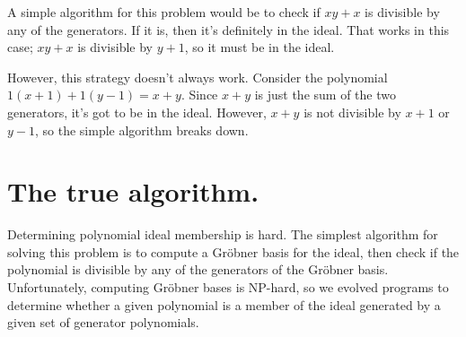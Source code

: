 \documentclass[12pt]{article}
\begin{document}
    A simple algorithm for this problem would be to check if $xy+x$ is divisible by any of the generators.
    If it is, then it's definitely in the ideal.
    That works in this case; $xy + x$ is divisible by $y+1$, so it must be in the ideal.

    However, this strategy doesn't always work.
    Consider the polynomial $1(x+1) + 1(y-1) = x + y$.
    Since $x+y$ is just the sum of the two generators, it's got to be in the ideal.
    However, $x + y$ is not divisible by $x+1$ or $y-1$, so the simple algorithm breaks down.

\newpage
\section*{The true algorithm.}

    Determining polynomial ideal membership is hard.
    The simplest algorithm for solving this problem is to compute a Gr\"obner basis for the ideal, then check if the polynomial is divisible by any of the generators of the Gr\"obner basis.
    Unfortunately, computing Gr\"obner bases is NP-hard, so we evolved programs to determine whether a given polynomial is a member of the ideal generated by a given set of generator polynomials.
\end{document}
